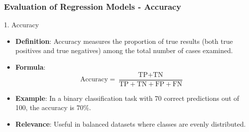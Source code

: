 \documentclass[aspectratio=169]{beamer}
\begin{document}
\begin{frame}[fragile]
    \frametitle{Evaluation of Regression Models - Accuracy}
    \begin{block}{1. Accuracy}
        \begin{itemize}
            \item \textbf{Definition}: Accuracy measures the proportion of true results (both true positives and true negatives) among the total number of cases examined.
            \item \textbf{Formula}:
            \begin{equation}
            \text{Accuracy} = \frac{\text{TP} + \text{TN}}{\text{TP} + \text{TN} + \text{FP} + \text{FN}}
            \end{equation}
            \item \textbf{Example}: In a binary classification task with 70 correct predictions out of 100, the accuracy is \(70\%\).
            \item \textbf{Relevance}: Useful in balanced datasets where classes are evenly distributed.
        \end{itemize}
    \end{block}
\end{frame}
\end{document}
